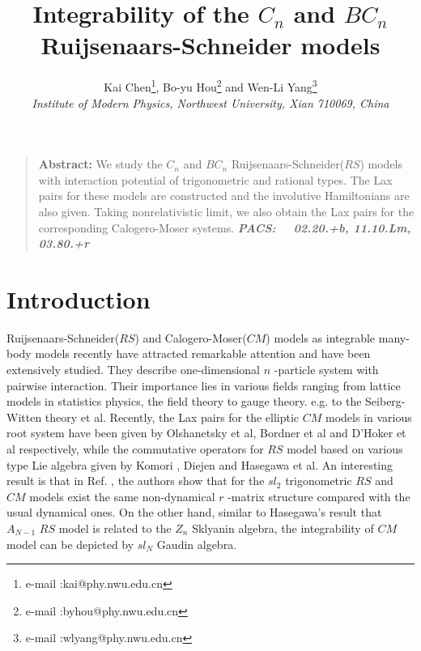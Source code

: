 \documentclass[a4paper,12pt]{article}
\newcommand{\sect}[1]{\setcounter{equation}{0}\section{#1}}
\begin{document}
\title{\textbf{Integrability of the $C_{n}$ and $BC_{n}$ Ruijsenaars-Schneider
models}}
\author{Kai Chen\thanks{
e-mail :kai@phy.nwu.edu.cn}, Bo-yu Hou\thanks{
e-mail :byhou@phy.nwu.edu.cn} and Wen-Li Yang\thanks{
e-mail :wlyang@phy.nwu.edu.cn} \\
{\small \textit{Institute of Modern Physics, Northwest University, Xian
710069, China }}}
\date{}
\maketitle

\begin{quote}
{\bf Abstract:} We study the $C_{n}$ and $BC_{n}$ Ruijsenaars-Schneider($RS$) models with
interaction potential of trigonometric and rational types. The Lax pairs for
these models are constructed and the involutive Hamiltonians are also given.
Taking nonrelativistic limit, we also obtain the Lax pairs for the
corresponding Calogero-Moser systems.\newline
\textbf{\textsl{\noindent PACS: \ \ 02.20.+b, 11.10.Lm, 03.80.+r}}
\end{quote}
\sect{Introduction}
Ruijsenaars-Schneider($RS$) and Calogero-Moser($CM$) models
as integrable many-body models recently have attracted remarkable attention
and have been extensively studied. They describe one-dimensional $n$%
-particle system with pairwise interaction. Their importance lies in various
fields ranging from lattice models in statistics physics\cite{h1, nksr}, the
field theory to gauge theory\cite{gm, n}. e.g. to the Seiberg-Witten theory
\cite{bmmm} et al. Recently, the Lax pairs for the elliptic $CM$ models in
various root system have been given by Olshanetsky et al\cite{op}, Bordner
et al\cite{bcs,bcs2,bcs3,bcs1} and D'Hoker et al\cite{hp1} respectively,
while the commutative operators for $RS$ model based on various type Lie
algebra given by Komori \cite{ko1, ko2}, Diejen\cite{di, di1} and Hasegawa%
\cite{h1, h2}et al. An interesting result is that in Ref. \cite{kai1}, the
authors show that for the $sl_{2}$ trigonometric $RS$ and $CM$ models exist the
same non-dynamical $r$ -matrix structure compared with the usual dynamical
ones. On the other hand, similar to Hasegawa's result that $A_{N-1}$ $RS$
model is related  to the $Z_n$ Sklyanin
algebra, the  integrability of	$CM$ model can be
depicted by $sl_{N}$ Gaudin algebra\cite{kai2}.
\end{document}
